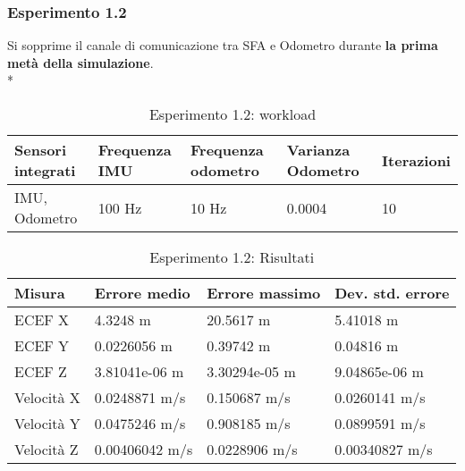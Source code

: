 \subsubsection{Esperimento 1.2}
Si sopprime il canale di comunicazione tra SFA e Odometro durante \textbf{la prima met\`a della simulazione}.\\*  
\begin{table}[h]
	\centering
\begin{tabular}{|p{3.25cm}|p{2cm}|p{2cm}|p{2cm}|p{2cm}|}
	\hline 
	\textbf{Sensori integrati} & \textbf{Frequenza IMU}  & \textbf{Frequenza odometro} & \textbf{Varianza Odometro} & \textbf{Iterazioni} \\ 
	\hline 
	IMU, Odometro & 100 Hz & 10 Hz & 0.0004 & 10 \\
	\hline 
\end{tabular}
	\caption{Esperimento 1.2: workload}
\end{table}
\FloatBarrier
\begin{table}[h]
	\centering
	\begin{tabular}{|p{2cm}|p{3.2cm}|p{3cm}|p{3cm}|}
		\hline 
		\textbf{Misura} 
		& \textbf{Errore medio} 
		& \textbf{Errore massimo}
		& \textbf{Dev. std. errore}\\ 
		\hline 
		ECEF X & 4.3248 m & 20.5617 m & 5.41018 m \\ 
		\hline 
		ECEF Y & 0.0226056 m & 0.39742 m & 0.04816 m \\ 
		\hline 
		ECEF Z & 3.81041e-06 m & 3.30294e-05 m & 9.04865e-06 m \\ 
		\hline 
		Velocit\`a X & 0.0248871 m/s & 0.150687 m/s & 0.0260141 m/s \\ 
		\hline 
		Velocit\`a Y & 0.0475246 m/s & 0.908185 m/s & 0.0899591 m/s \\ 
		\hline 
		Velocit\`a Z & 0.00406042 m/s & 0.0228906 m/s & 0.00340827 m/s \\ 
		\hline 
	\end{tabular} 
	\caption{Esperimento 1.2: Risultati}
\end{table}
